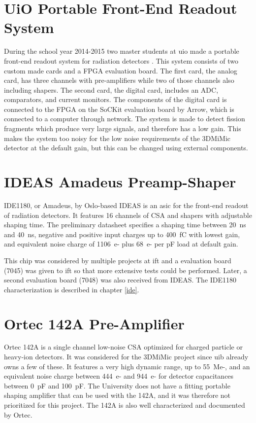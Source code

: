 \documentclass[../main/thesis.tex]{subfiles}
\begin{document}
\section{UiO Portable Front-End Readout System}
\label{e-uio}
During the school year 2014-2015 two master students at \gls{uio} made a portable front-end readout system for radiation detectors \citep{tali} \citep{oltedal}. This system consists of two custom made cards and a \gls{FPGA} evaluation board. The first card, the analog card, has three channels with pre-amplifiers while two of those channels also including shapers. The second card, the digital card, includes an \gls{ADC}, comparators, and current monitors. The components of the digital card is connected to the \gls{FPGA} on the SoCKit evaluation board by Arrow, which is connected to a computer through network. The system is made to detect fission fragments which produce very large signals, and therefore has a low gain. This makes the system too noisy for the low noise requirements of the 3DMiMic detector at the default gain, but this can be changed using external components.

\section{IDEAS Amadeus Preamp-Shaper}
\label{e-ide1180}
IDE1180, or Amadeus, by Oslo-based IDEAS is an \gls{asic} for the front-end readout of radiation detectors. It features 16 channels of \gls{CSA} and shapers with adjustable shaping time. The preliminary datasheet \citep{IDE1180} specifies a shaping time between 20~ns and 40~ns, negative and positive input charges up to 400~fC with lowest gain, and equivalent noise charge of 1106~e- plus 68~e- per pF load at default gain. 

This chip was considered by multiple projects at \gls{ift} and a evaluation board (7045) was given to \gls{ift} so that more extensive tests could be performed. Later, a second evaluation board (7048) was also received from IDEAS. The IDE1180 characterization is described in chapter \ref{ide}. 

\section{Ortec 142A Pre-Amplifier}
\label{e-ortec}
Ortec 142A is a single channel low-noise \gls{CSA} optimized for charged particle or heavy-ion detectors. It was considered for the 3DMiMic project since \gls{uib} already owns a few of these. It features a very high dynamic range, up to 55~Me-, and an equivalent noise charge between 444~e- and 944~e- for detector capacitances between 0~pF and 100~pF. The University does not have a fitting portable shaping amplifier that can be used with the 142A, and it was therefore not prioritized for this project. The 142A is also well characterized and documented by Ortec.
\end{document}
